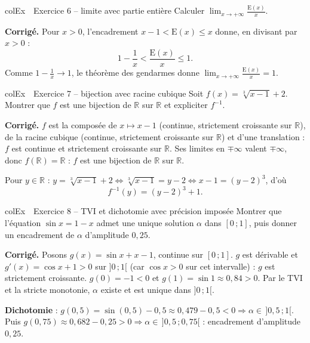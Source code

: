 \documentclass[11pt,a4paper]{article}
\newenvironment{exemple}[1][Exemple]
  {\begin{fiche}{colEx}{\ding{217}~~#1}}{\end{fiche}}
\newcommand{\E}{\mathrm{E}}
\begin{document}
\begin{exemple}[Exercice 6 -- limite avec partie entière]
Calculer $\displaystyle\lim_{x \to +\infty} \frac{\E(x)}{x}$.

\smallskip
\textbf{Corrigé.} Pour $x > 0$, l'encadrement $x - 1 < \E(x) \leq x$ donne, en divisant par $x > 0$ :
\[
  1 - \frac{1}{x} < \frac{\E(x)}{x} \leq 1.
\]
Comme $1 - \frac{1}{x} \to 1$, le théorème des gendarmes donne $\displaystyle\lim_{x \to +\infty} \frac{\E(x)}{x} = 1$.
\end{exemple}

\begin{exemple}[Exercice 7 -- bijection avec racine cubique]
Soit $f(x) = \sqrt[3]{x - 1} + 2$. Montrer que $f$ est une bijection de $\mathbb{R}$ sur $\mathbb{R}$ et expliciter $f^{-1}$.

\smallskip
\textbf{Corrigé.} $f$ est la composée de $x \mapsto x - 1$ (continue, strictement croissante sur $\mathbb{R}$), de la racine cubique (continue, strictement croissante sur $\mathbb{R}$) et d'une translation : $f$ est continue et strictement croissante sur $\mathbb{R}$. Ses limites en $\mp\infty$ valent $\mp\infty$, donc $f(\mathbb{R}) = \mathbb{R}$ : $f$ est une bijection de $\mathbb{R}$ sur $\mathbb{R}$.

\smallskip
Pour $y \in \mathbb{R}$ : $y = \sqrt[3]{x - 1} + 2 \iff \sqrt[3]{x - 1} = y - 2 \iff x - 1 = (y - 2)^3$, d'où
\[
  f^{-1}(y) = (y - 2)^3 + 1.
\]
\end{exemple}

\begin{exemple}[Exercice 8 -- TVI et dichotomie avec précision imposée]
Montrer que l'équation $\sin x = 1 - x$ admet une unique solution $\alpha$ dans $[0\,;1]$, puis donner un encadrement de $\alpha$ d'amplitude $0{,}25$.

\smallskip
\textbf{Corrigé.} Posons $g(x) = \sin x + x - 1$, continue sur $[0\,;1]$. $g$ est dérivable et $g'(x) = \cos x + 1 > 0$ sur $]0\,;1[$ (car $\cos x > 0$ sur cet intervalle) : $g$ est strictement croissante. $g(0) = -1 < 0$ et $g(1) = \sin 1 \approx 0{,}84 > 0$. Par le TVI et la stricte monotonie, $\alpha$ existe et est unique dans $]0\,;1[$.

\smallskip
\textbf{Dichotomie} : $g(0{,}5) = \sin(0{,}5) - 0{,}5 \approx 0{,}479 - 0{,}5 < 0 \Rightarrow \alpha \in\, ]0{,}5\,;1[$. Puis $g(0{,}75) \approx 0{,}682 - 0{,}25 > 0 \Rightarrow \alpha \in\, ]0{,}5\,;0{,}75[$ : encadrement d'amplitude $0{,}25$.
\end{exemple}
\end{document}
